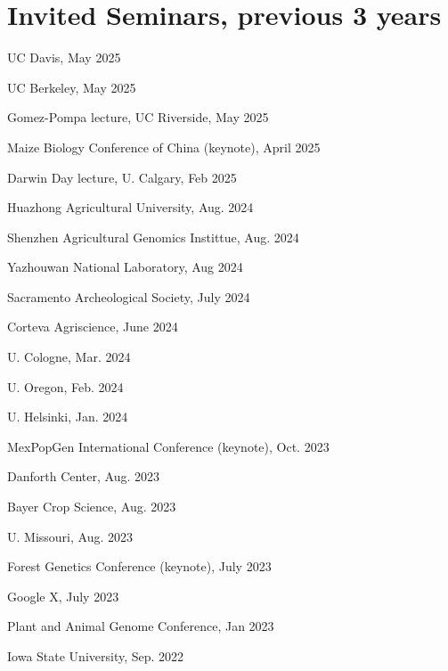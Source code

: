 \documentclass[letterpaper,10pt]{article}
\renewenvironment{itemize}{
  \begin{list}{}{
    \setlength{\leftmargin}{1.5em}
  }
}{
  \end{list}
}
\begin{document}
\section*{Invited Seminars, previous 3 years}
\begin{itemize}
\setlength\itemsep{0ex}
\item UC Davis, May 2025
\item UC Berkeley, May 2025
\item Gomez-Pompa lecture, UC Riverside, May 2025
\item Maize Biology Conference of China (keynote), April 2025
\item Darwin Day lecture, U. Calgary, Feb 2025
\item Huazhong Agricultural University, Aug. 2024
\item Shenzhen Agricultural Genomics Instittue, Aug. 2024
\item Yazhouwan National Laboratory, Aug 2024
\item Sacramento Archeological Society, July 2024
\item Corteva Agriscience, June 2024
\item U. Cologne, Mar. 2024
\item U. Oregon, Feb. 2024
\item U. Helsinki, Jan. 2024
\item MexPopGen International Conference (keynote), Oct. 2023
\item Danforth Center, Aug. 2023
\item Bayer Crop Science, Aug. 2023
\item U. Missouri, Aug. 2023
\item Forest Genetics Conference (keynote), July 2023
\item Google X, July 2023
\item Plant and Animal Genome Conference, Jan 2023
\item Iowa State University, Sep. 2022

\end{itemize}
\end{document}
